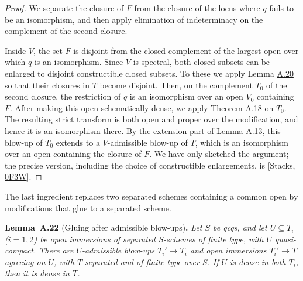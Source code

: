 \documentclass[11pt]{article}
\newenvironment{bpstatement}[2]{\par\addvspace{0.6\baselineskip}\noindent\textbf{#1}#2\textbf{.}\enspace\ignorespaces}
  {\par\addvspace{0.4\baselineskip}}
\newenvironment{bpstatementit}[2]{\begin{bpstatement}{#1}{#2}\itshape\ignorespaces}{\end{bpstatement}}
\begin{document}
\begin{proof}[{Proof}]\label{bp58}%
We separate the closure of \(F\) from the closure of the locus where \(q\) fails to be an isomorphism, and then apply elimination of indeterminacy on the complement of the second closure.

Inside \(V\), the set \(F\) is disjoint from the closed complement of the largest open over which \(q\) is an isomorphism. Since \(V\) is spectral, both closed subsets can be enlarged to disjoint constructible closed subsets. To these we apply Lemma \hyperref[bp55]{A.20} so that their closures in \(T\) become disjoint. Then, on the complement \(T_0\) of the second closure, the restriction of \(q\) is an isomorphism over an open \(V_0\) containing \(F\). After making this open schematically dense, we apply Theorem \hyperref[bp48]{A.18} on \(T_0\). The resulting strict transform is both open and proper over the modification, and hence it is an isomorphism there. By the extension part of Lemma \hyperref[bp35]{A.13}, this blow-up of \(T_0\) extends to a \(V\)-admissible blow-up of \(T\), which is an isomorphism over an open containing the closure of \(F\). We have only sketched the argument; the precise version, including the choice of constructible enlargements, is [Stacks, \href{https://stacks.math.columbia.edu/tag/0F3W}{0F3W}].
\end{proof}

\label{bp59}%
The last ingredient replaces two separated schemes containing a common open by modifications that glue to a separated scheme.

\label{bp60}%
\begin{bpstatementit}{Lemma~A.22}{ (Gluing after admissible blow-ups)}
Let \(S\) be qcqs, and let \(U\subseteq T_i\) (\(i=1,2\)) be open immersions of separated \(S\)-schemes of finite type, with \(U\) quasi-compact. There are \(U\)-admissible blow-ups \(T_i'\to T_i\) and open immersions \(T_i'\to T\) agreeing on \(U\), with \(T\) separated and of finite type over \(S\). If \(U\) is dense in both \(T_i\), then it is dense in \(T\).
\end{bpstatementit}
\end{document}
